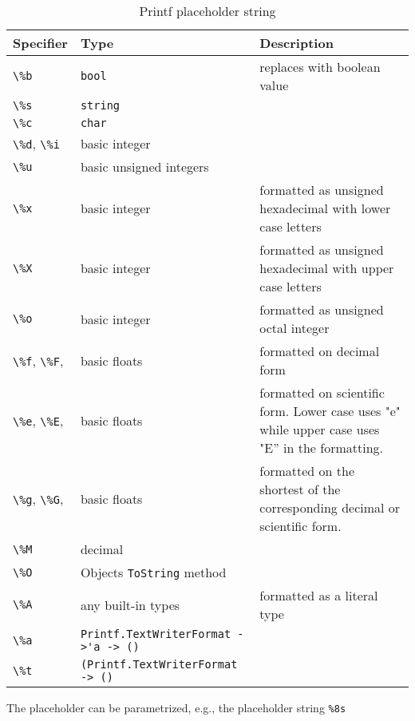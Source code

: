 \begin{table}
  \centering
  \begin{tabularx}{\linewidth}{|l|l|X|}
    \hline
    \rowcolor{headerRowColor} Specifier& Type&Description\\
    \hline
    \lstinline!\%b!&\lstinline!bool!&replaces with boolean value\\
    \hline
    \lstinline!\%s!&\lstinline!string!&\\
    \hline
    \lstinline!\%c!&\lstinline!char!&\\
    \hline
    \mbox{\lstinline!\%d!,} \mbox{\lstinline!\%i!}&basic integer&\\
    \hline
    \lstinline!\%u!&basic unsigned integers&\\
    \hline
    \lstinline!\%x!&basic integer&formatted as unsigned hexadecimal with lower case letters\\
    \hline
    \lstinline!\%X!&basic integer&formatted as unsigned hexadecimal with upper case letters\\
    \hline
    \lstinline!\%o!&basic integer&formatted as unsigned octal integer\\
    \hline
    \mbox{\lstinline!\%f!,} \mbox{\lstinline!\%F!,} &basic floats&formatted on decimal form\\
    \hline
    \mbox{\lstinline!\%e!,} \mbox{\lstinline!\%E!,} &basic floats&formatted on scientific form. Lower case uses "e" while upper case uses "E'' in the formatting.\\
    \hline
    \mbox{\lstinline!\%g!,} \mbox{\lstinline!\%G!,} &basic floats&formatted on the shortest of the corresponding decimal or scientific form.\\
    \hline
    \lstinline!\%M!&decimal&\\
    \hline
    \lstinline!\%O!&Objects \lstinline!ToString! method&\\
    \hline
    \lstinline!\%A!&any built-in types&formatted as a literal type\\
    \hline
    \lstinline!\%a!&\lstinline[language=ebnf]!Printf.TextWriterFormat ->'a -> ()!&\\
    \hline
    \lstinline!\%t!&\lstinline[language=ebnf]!(Printf.TextWriterFormat -> ()!&\\
    \hline
  \end{tabularx}
  \caption{Printf placeholder string}
  \label{tab:printfPlaceholder}
\end{table}
The placeholder can be parametrized, e.g.,  the placeholder string \lstinline{%8s} %
